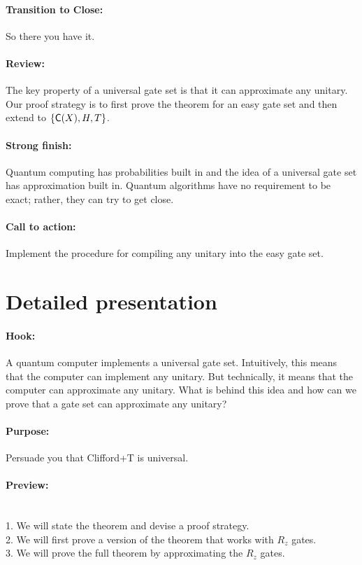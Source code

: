 \documentclass[11pt]{article}
\def\C#1{\text{\sf C}{(#1)}}
\begin{document}
\paragraph{Transition to Close:} 
So there you have it.

\paragraph{Review:}
The key property of a universal gate set is that 
it can approximate any unitary.
Our proof strategy is to first prove the theorem for an easy gate set and then
extend to $\{\C{X}, H, T\}$.

\paragraph{Strong finish:}
Quantum computing has probabilities built in and
the idea of a universal gate set has approximation built in.
Quantum algorithms have no requirement to be exact; 
rather, they can try to get close.

\paragraph{Call to action:}
Implement the procedure for compiling any unitary into the easy gate set.

\newpage

\section*{Detailed presentation}

\paragraph{Hook:} 
A quantum computer implements a universal gate set.
Intuitively, this means that the computer can implement any unitary. 
But technically, it means that the computer can approximate any unitary.
What is behind this idea and how can we prove that 
a gate set can approximate any unitary?

\paragraph{Purpose:} Persuade you that Clifford+T is universal.

\paragraph{Preview:} \mbox{} \\
\hspace*{1cm}
1. We will state the theorem and devise a proof strategy.
\\
\hspace*{1cm}
2. We will first prove a version of the theorem that works with $R_z$ gates.
\\
\hspace*{1cm}
3. We will prove the full theorem by approximating the $R_z$ gates.
\end{document}
